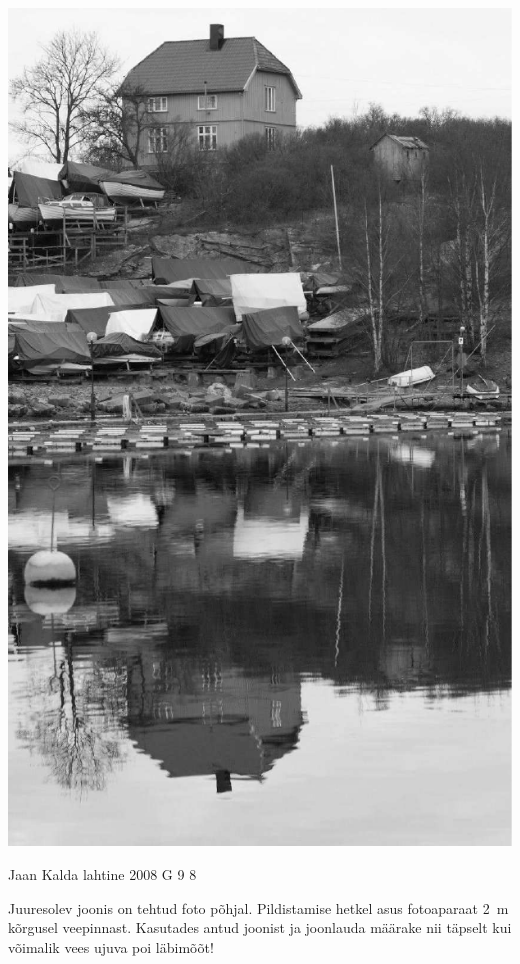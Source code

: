 \documentclass[11pt]{article}
\begin{document}
{{\begin{center}
	\includegraphics[height=\textheight]{2008-v3g-04-yl}
\end{center}
\fi
}

{Jaan Kalda} %
{lahtine} %
{2008} %
{G 9} %
{8} %
{
\ifStatement
Juuresolev joonis on tehtud foto põhjal. Pildistamise hetkel asus fotoaparaat \SI{2}{m} kõrgusel veepinnast. Kasutades antud joonist ja joonlauda määrake nii täpselt kui võimalik vees ujuva poi läbimõõt!

}}
\end{document}
